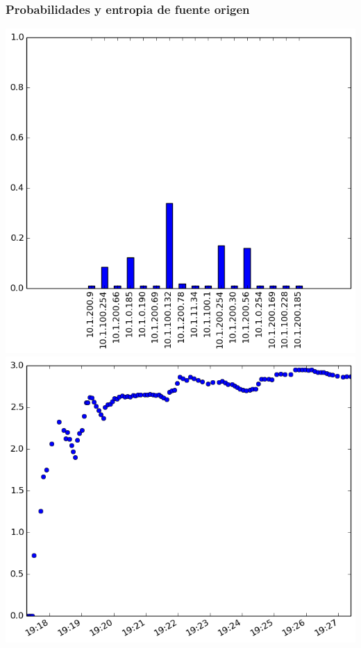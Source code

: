 \subsubsection{Probabilidades y entropia de fuente origen}
\includegraphics[scale=0.33]{../experimentacion-svilerino/labo-entrepisodc/histogram_src_probabilities.png}
\includegraphics[scale=0.33]{../experimentacion-svilerino/labo-entrepisodc/entropy_src.png}

